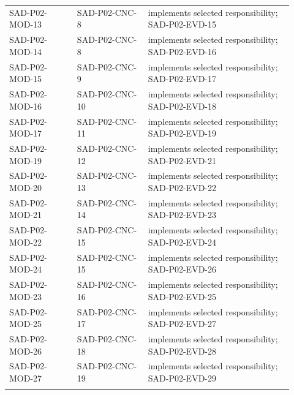 \documentclass[10pt,letterpaper]{article}
\begin{document}
\begin{longtable}{@{}>{\raggedright\arraybackslash}p{0.22\linewidth}>{\raggedright\arraybackslash}p{0.23\linewidth}>{\raggedright\arraybackslash}p{0.47\linewidth}@{}}
SAD-P02-MOD-13 & SAD-P02-CNC-8 & implements selected responsibility; SAD-P02-EVD-15\\\addlinespace
SAD-P02-MOD-14 & SAD-P02-CNC-8 & implements selected responsibility; SAD-P02-EVD-16\\\addlinespace
SAD-P02-MOD-15 & SAD-P02-CNC-9 & implements selected responsibility; SAD-P02-EVD-17\\\addlinespace
SAD-P02-MOD-16 & SAD-P02-CNC-10 & implements selected responsibility; SAD-P02-EVD-18\\\addlinespace
SAD-P02-MOD-17 & SAD-P02-CNC-11 & implements selected responsibility; SAD-P02-EVD-19\\\addlinespace
SAD-P02-MOD-19 & SAD-P02-CNC-12 & implements selected responsibility; SAD-P02-EVD-21\\\addlinespace
SAD-P02-MOD-20 & SAD-P02-CNC-13 & implements selected responsibility; SAD-P02-EVD-22\\\addlinespace
SAD-P02-MOD-21 & SAD-P02-CNC-14 & implements selected responsibility; SAD-P02-EVD-23\\\addlinespace
SAD-P02-MOD-22 & SAD-P02-CNC-15 & implements selected responsibility; SAD-P02-EVD-24\\\addlinespace
SAD-P02-MOD-24 & SAD-P02-CNC-15 & implements selected responsibility; SAD-P02-EVD-26\\\addlinespace
SAD-P02-MOD-23 & SAD-P02-CNC-16 & implements selected responsibility; SAD-P02-EVD-25\\\addlinespace
SAD-P02-MOD-25 & SAD-P02-CNC-17 & implements selected responsibility; SAD-P02-EVD-27\\\addlinespace
SAD-P02-MOD-26 & SAD-P02-CNC-18 & implements selected responsibility; SAD-P02-EVD-28\\\addlinespace
SAD-P02-MOD-27 & SAD-P02-CNC-19 & implements selected responsibility; SAD-P02-EVD-29\\\addlinespace
\bottomrule\end{longtable}
\end{document}

